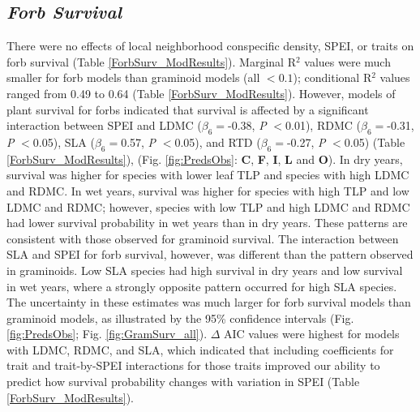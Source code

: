 \documentclass[12pt, letterpaper]{article}
\begin{document}
\subsection{\textit{Forb Survival}} 
There were no effects of local neighborhood conspecific density, SPEI, or traits on forb survival (Table \ref{ForbSurv_ModResults}). Marginal R$^2$ values were much smaller for forb models than graminoid models (all $<0.1$); conditional R$^2$ values ranged from 0.49 to 0.64 (Table \ref{ForbSurv_ModResults}). However, models of plant survival for forbs indicated that survival is affected by a significant interaction between SPEI and LDMC ($\beta_6=$-0.38, \textit{P} $<$0.01), RDMC ($\beta _6=$-0.31, \textit{P} $<$0.05), SLA ($\beta _6=$0.57, \textit{P} $<$0.05), and RTD ($\beta _6=$-0.27, \textit{P} $<$0.05) (Table \ref{ForbSurv_ModResults}), (Fig. \ref{fig:PredsObs}: \textbf{C}, \textbf{F}, \textbf{I}, \textbf{L} and \textbf{O}). In dry years, survival was higher for species with lower leaf TLP and species with high LDMC and RDMC. In wet years, survival was higher for species with high TLP and low LDMC and RDMC; however, species with low TLP and high LDMC and RDMC had lower survival probability in wet years than in dry years. These patterns are consistent with those observed for graminoid survival. The interaction between SLA and SPEI for forb survival, however, was different than the pattern observed in graminoids. Low SLA species had high survival in dry years and low survival in wet years, where a strongly opposite pattern occurred for high SLA species. The uncertainty in these estimates was much larger for forb survival models than graminoid models, as illustrated by the 95\% confidence intervals (Fig. \ref{fig:PredsObs}; Fig. \ref{fig:GramSurv_all}). $\Delta$ AIC values were highest for models with LDMC, RDMC, and SLA, which indicated that including coefficients for trait and trait-by-SPEI interactions for those traits improved our ability to predict how survival probability changes with variation in SPEI (Table \ref{ForbSurv_ModResults}).
\end{document}
